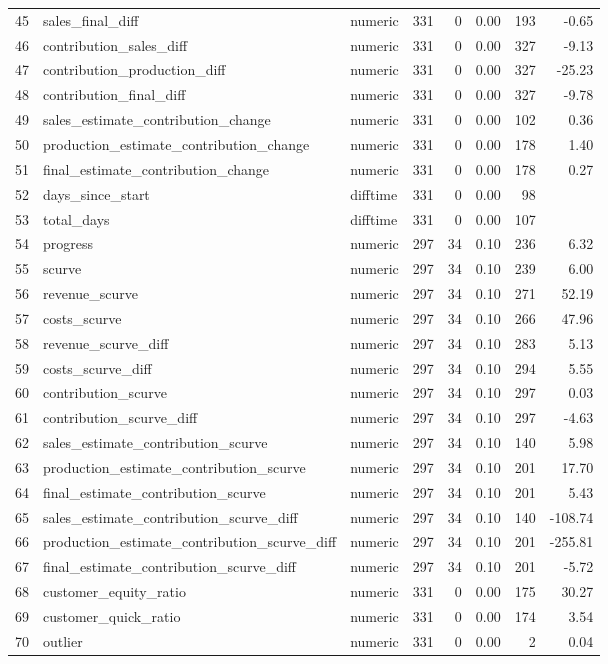 \begin{sidewaystable}[ht]
\begin{tabular}{rllrrrrr}
  45 & sales\_final\_diff & numeric & 331 &   0 & 0.00 & 193 & -0.65 \\ 
  46 & contribution\_sales\_diff & numeric & 331 &   0 & 0.00 & 327 & -9.13 \\ 
  47 & contribution\_production\_diff & numeric & 331 &   0 & 0.00 & 327 & -25.23 \\ 
  48 & contribution\_final\_diff & numeric & 331 &   0 & 0.00 & 327 & -9.78 \\ 
  49 & sales\_estimate\_contribution\_change & numeric & 331 &   0 & 0.00 & 102 & 0.36 \\ 
  50 & production\_estimate\_contribution\_change & numeric & 331 &   0 & 0.00 & 178 & 1.40 \\ 
  51 & final\_estimate\_contribution\_change & numeric & 331 &   0 & 0.00 & 178 & 0.27 \\ 
  52 & days\_since\_start & difftime & 331 &   0 & 0.00 &  98 &  \\ 
  53 & total\_days & difftime & 331 &   0 & 0.00 & 107 &  \\ 
  54 & progress & numeric & 297 &  34 & 0.10 & 236 & 6.32 \\ 
  55 & scurve & numeric & 297 &  34 & 0.10 & 239 & 6.00 \\ 
  56 & revenue\_scurve & numeric & 297 &  34 & 0.10 & 271 & 52.19 \\ 
  57 & costs\_scurve & numeric & 297 &  34 & 0.10 & 266 & 47.96 \\ 
  58 & revenue\_scurve\_diff & numeric & 297 &  34 & 0.10 & 283 & 5.13 \\ 
  59 & costs\_scurve\_diff & numeric & 297 &  34 & 0.10 & 294 & 5.55 \\ 
  60 & contribution\_scurve & numeric & 297 &  34 & 0.10 & 297 & 0.03 \\ 
  61 & contribution\_scurve\_diff & numeric & 297 &  34 & 0.10 & 297 & -4.63 \\ 
  62 & sales\_estimate\_contribution\_scurve & numeric & 297 &  34 & 0.10 & 140 & 5.98 \\ 
  63 & production\_estimate\_contribution\_scurve & numeric & 297 &  34 & 0.10 & 201 & 17.70 \\ 
  64 & final\_estimate\_contribution\_scurve & numeric & 297 &  34 & 0.10 & 201 & 5.43 \\ 
  65 & sales\_estimate\_contribution\_scurve\_diff & numeric & 297 &  34 & 0.10 & 140 & -108.74 \\ 
  66 & production\_estimate\_contribution\_scurve\_diff & numeric & 297 &  34 & 0.10 & 201 & -255.81 \\ 
  67 & final\_estimate\_contribution\_scurve\_diff & numeric & 297 &  34 & 0.10 & 201 & -5.72 \\ 
  68 & customer\_equity\_ratio & numeric & 331 &   0 & 0.00 & 175 & 30.27 \\ 
  69 & customer\_quick\_ratio & numeric & 331 &   0 & 0.00 & 174 & 3.54 \\ 
  70 & outlier & numeric & 331 &   0 & 0.00 &   2 & 0.04 \\ 
   \hline
\end{tabular}
\end{sidewaystable}
